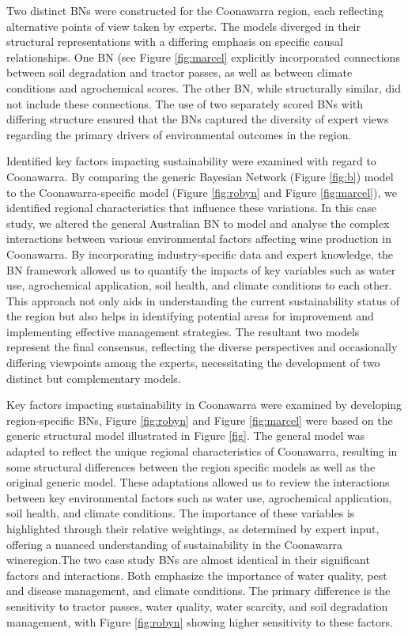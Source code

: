 Two distinct BNs were constructed for the Coonawarra region, each reflecting alternative points of view taken by experts. The models diverged in their structural representations with a differing emphasis on specific causal relationships. One BN  (see Figure \ref{fig:marcel} explicitly incorporated connections between soil degradation and tractor passes, as well as between climate conditions and agrochemical scores. The other BN, while structurally similar, did not include these connections. The use of two separately scored BNs with differing structure ensured that the BNs captured the diversity of expert views regarding the primary drivers of environmental outcomes in the region.

Identified key factors impacting sustainability were examined with regard to Coonawarra. By comparing the generic Bayesian Network (Figure \ref{fig:b}) model to the Coonawarra-specific model (Figure \ref{fig:robyn} and Figure \ref{fig:marcel}), we identified regional characteristics that influence these variations. In this case study, we altered the general Australian BN to model and analyse the complex interactions between various environmental factors affecting wine production in Coonawarra. By incorporating industry-specific data and expert knowledge, the BN framework allowed us to quantify the impacts of key variables such as water use, agrochemical application, soil health, and climate conditions to each other. This approach not only aids in understanding the current sustainability status of the region but also helps in identifying potential areas for improvement and implementing effective management strategies. The resultant two models represent the final consensus, reflecting the diverse perspectives and occasionally differing viewpoints among the experts, necessitating the development of two distinct but complementary models.

Key factors impacting sustainability in Coonawarra were examined by developing region-specific BNs, Figure \ref{fig:robyn} and Figure \ref{fig:marcel} were based on the generic structural model illustrated in Figure \ref{fig}. The general model was adapted to reflect the unique regional characteristics of Coonawarra, resulting in some structural differences between the region specific models as well as the original generic model. These adaptations allowed us to review the interactions between key environmental factors such as water use, agrochemical application, soil health, and climate conditions. The importance of these variables is highlighted through their relative weightings, as determined by expert input, offering a nuanced understanding of sustainability in the Coonawarra wineregion.The two case study BNs are almost identical in their significant factors and interactions. Both emphasize the importance of water quality, pest and disease management, and climate conditions. The primary difference is the sensitivity to tractor passes, water quality, water scarcity, and soil degradation management, with Figure \ref{fig:robyn} showing higher sensitivity to these factors. 

